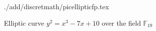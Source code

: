 \begin{figure}
\centering
 {./add/discretmath/picellipticfp.tex}
\caption{Elliptic curve $y^2 = x^3 -7 x + 10$ over the field
  $\mathbb{F}_{19}$}
\label{fig:add:ellipticFp}
\end{figure}